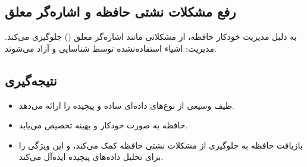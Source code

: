 \documentclass[11pt, a4paper, oneside]{book}
\begin{document}
			\subsection{رفع مشکلات نشتی حافظه و اشاره‌گر معلق}
			
				 به دلیل مدیریت خودکار حافظه، از مشکلاتی مانند اشاره‌گر معلق () جلوگیری می‌کند.
				مدیریت: اشیاء استفاده‌نشده توسط  شناسایی و آزاد می‌شوند.
			
			\subsection{نتیجه‌گیری}
			
				\begin{itemize}
					
					\item {} طیف وسیعی از نوع‌های داده‌ای ساده و پیچیده را ارائه می‌دهد.
					
					\item حافظه به صورت خودکار و بهینه تخصیص می‌یابد.
					
					\item بازیافت حافظه به جلوگیری از مشکلات نشتی حافظه کمک می‌کند، و این ویژگی  را برای تحلیل داده‌های پیچیده ایده‌آل می‌کند.
					
				\end{itemize}
	
\end{document}
